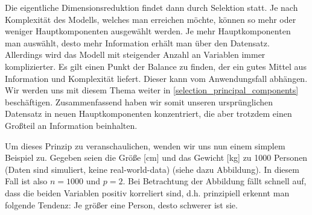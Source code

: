 Die eigentliche Dimensionsreduktion findet dann durch Selektion statt. Je nach Komplexität des Modells, welches man erreichen möchte, können so mehr oder weniger Hauptkomponenten ausgewählt werden. Je mehr Hauptkomponenten man auswählt, desto mehr Information erhält man über den Datensatz. Allerdings wird das Modell mit steigender Anzahl an Variablen immer komplizierter. Es gilt einen Punkt der Balance zu finden, der ein gutes Mittel aus Information und Komplexität liefert. Dieser kann vom Anwendungsfall abhängen. Wir werden uns mit diesem Thema weiter in \ref{selection_principal_components} beschäftigen.
Zusammenfassend haben wir somit unseren ursprünglichen Datensatz in neuen Hauptkomponenten konzentriert, die aber trotzdem einen Großteil an Information beinhalten.

Um dieses Prinzip zu veranschaulichen, wenden wir uns nun einem simplem Beispiel zu. Gegeben seien die Größe [cm] und das Gewicht [kg] zu 1000 Personen (Daten sind simuliert, keine real-world-data) (siehe dazu Abbildung). In diesem Fall ist also $n = 1000$ und $p = 2$. Bei Betrachtung der Abbildung fällt schnell auf, dass die beiden Variablen positiv korreliert sind, d.h. prinzipiell erkennt man folgende Tendenz: Je größer eine Person, desto schwerer ist sie. 

